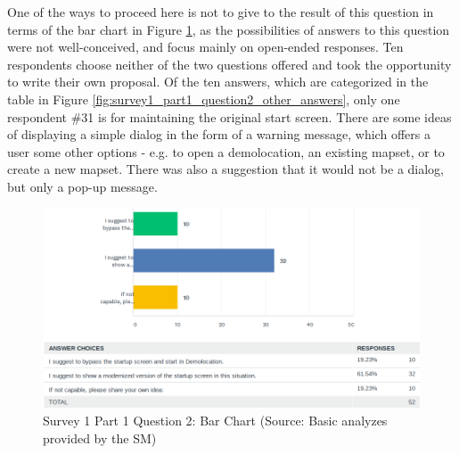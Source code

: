 \documentclass[a4paper,10pt,twoside]{article}
\begin{document}
One of the ways to proceed here is not to give to the result of this question in terms of the bar chart in Figure \ref{fig:survey1_part1_question2_histogram_sm}, as the possibilities of answers to this question were not well-conceived, and focus mainly on open-ended responses. Ten respondents choose neither of the two questions offered and took the opportunity to write their own proposal. Of the ten answers, which are categorized in the table in Figure \ref{fig:survey1_part1_question2_other_answers}, only one respondent \#31 is for maintaining the original start screen. There are some ideas of displaying a simple dialog in the form of a warning message, which offers a user some other options - e.g. to open a demolocation, an existing mapset, or to create a new mapset. There was also a suggestion that it would not be a dialog, but only a pop-up message.

\vspace{0.3cm}
\begin{figure}[hbt!] 
\begin{center}
\includegraphics[width=17cm]{../surveys/analyzed_data/survey1_part1_question2_histogram_sm.png} 
\caption[Survey 1 Part 1 Question 2: Bar Chart]{Survey 1 Part 1 Question 2: Bar Chart (Source: Basic analyzes provided by the SM)}
\label{fig:survey1_part1_question2_histogram_sm}
\end{center}
\end{figure}
\end{document}
